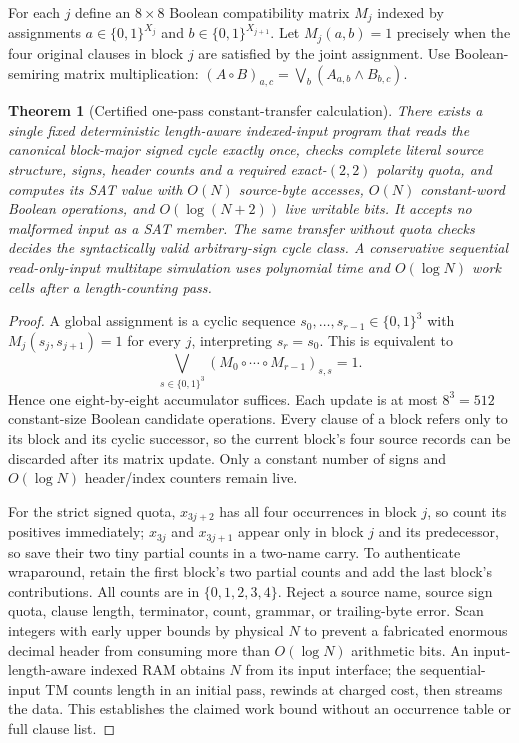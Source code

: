 \documentclass[11pt]{article}
\newtheorem{theorem}{Theorem}
\begin{document}
For each $j$ define an $8\times8$ Boolean compatibility matrix $M_j$ indexed by assignments $a\in\{0,1\}^{X_j}$ and $b\in\{0,1\}^{X_{j+1}}$. Let $M_j(a,b)=1$ precisely when the four original clauses in block $j$ are satisfied by the joint assignment. Use Boolean-semiring matrix multiplication: $(A\circ B)_{a,c}=\bigvee_b(A_{a,b}\wedge B_{b,c})$.
\begin{theorem}[Certified one-pass constant-transfer calculation]
There exists a single fixed deterministic length-aware indexed-input program that reads the canonical block-major signed cycle exactly once, checks complete literal source structure, signs, header counts and a required exact-$(2,2)$ polarity quota, and computes its SAT value with $O(N)$ source-byte accesses, $O(N)$ constant-word Boolean operations, and $O(\log(N+2))$ live writable bits. It accepts no malformed input as a SAT member. The same transfer without quota checks decides the syntactically valid arbitrary-sign cycle class. A conservative sequential read-only-input multitape simulation uses polynomial time and $O(\log N)$ work cells after a length-counting pass.
\end{theorem}
\begin{proof}
A global assignment is a cyclic sequence $s_0,\ldots,s_{r-1}\in\{0,1\}^3$ with $M_j(s_j,s_{j+1})=1$ for every $j$, interpreting $s_r=s_0$. This is equivalent to
\[
 \bigvee_{s\in\{0,1\}^3}\left(M_0\circ\cdots\circ M_{r-1}\right)_{s,s}=1.
\]
Hence one eight-by-eight accumulator suffices. Each update is at most $8^3=512$ constant-size Boolean candidate operations. Every clause of a block refers only to its block and its cyclic successor, so the current block's four source records can be discarded after its matrix update. Only a constant number of signs and $O(\log N)$ header/index counters remain live.

For the strict signed quota, $x_{3j+2}$ has all four occurrences in block $j$, so count its positives immediately; $x_{3j}$ and $x_{3j+1}$ appear only in block $j$ and its predecessor, so save their two tiny partial counts in a two-name carry. To authenticate wraparound, retain the first block's two partial counts and add the last block's contributions. All counts are in $\{0,1,2,3,4\}$. Reject a source name, source sign quota, clause length, terminator, count, grammar, or trailing-byte error. Scan integers with early upper bounds by physical $N$ to prevent a fabricated enormous decimal header from consuming more than $O(\log N)$ arithmetic bits. An input-length-aware indexed RAM obtains $N$ from its input interface; the sequential-input TM counts length in an initial pass, rewinds at charged cost, then streams the data. This establishes the claimed work bound without an occurrence table or full clause list.
\end{proof}
\end{document}
